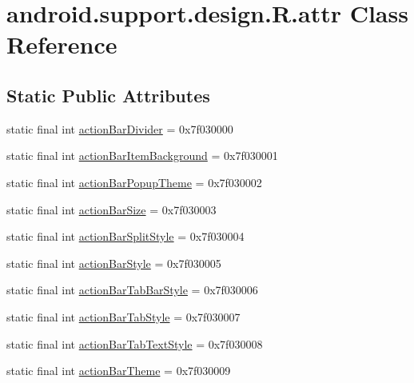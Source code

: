 \hypertarget{classandroid_1_1support_1_1design_1_1R_1_1attr}{}\section{android.\+support.\+design.\+R.\+attr Class Reference}
\label{classandroid_1_1support_1_1design_1_1R_1_1attr}
\subsection*{Static Public Attributes}
\begin{DoxyCompactItemize}
\item 
static final int \mbox{\hyperlink{classandroid_1_1support_1_1design_1_1R_1_1attr_ae760bb3759dc75e0a49d12b13a525863}{action\+Bar\+Divider}} = 0x7f030000
\item 
static final int \mbox{\hyperlink{classandroid_1_1support_1_1design_1_1R_1_1attr_a22428b19c7a60481d738d41421d2cae0}{action\+Bar\+Item\+Background}} = 0x7f030001
\item 
static final int \mbox{\hyperlink{classandroid_1_1support_1_1design_1_1R_1_1attr_a3099f3c0b99e3397da50683e55b24099}{action\+Bar\+Popup\+Theme}} = 0x7f030002
\item 
static final int \mbox{\hyperlink{classandroid_1_1support_1_1design_1_1R_1_1attr_a3b80a59651b1b38d6c5497c22058009a}{action\+Bar\+Size}} = 0x7f030003
\item 
static final int \mbox{\hyperlink{classandroid_1_1support_1_1design_1_1R_1_1attr_af3f9f00064ed4da503a855889da464de}{action\+Bar\+Split\+Style}} = 0x7f030004
\item 
static final int \mbox{\hyperlink{classandroid_1_1support_1_1design_1_1R_1_1attr_afe4ac373c79d64575d48146ce16087f2}{action\+Bar\+Style}} = 0x7f030005
\item 
static final int \mbox{\hyperlink{classandroid_1_1support_1_1design_1_1R_1_1attr_a2ca82a9598dc456d84aabd95ed349dc2}{action\+Bar\+Tab\+Bar\+Style}} = 0x7f030006
\item 
static final int \mbox{\hyperlink{classandroid_1_1support_1_1design_1_1R_1_1attr_a52b2ed4142fd2acadf605ff733a7443b}{action\+Bar\+Tab\+Style}} = 0x7f030007
\item 
static final int \mbox{\hyperlink{classandroid_1_1support_1_1design_1_1R_1_1attr_ab794448e6906906fc9edb74109c3ad5e}{action\+Bar\+Tab\+Text\+Style}} = 0x7f030008
\item 
static final int \mbox{\hyperlink{classandroid_1_1support_1_1design_1_1R_1_1attr_a92eaedad4431dca9ec3d00edd8434ce2}{action\+Bar\+Theme}} = 0x7f030009

\end{DoxyCompactItemize}
